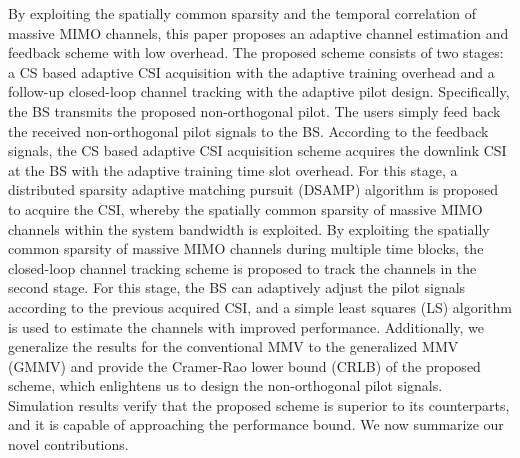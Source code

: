 \documentclass[final]{IEEEtran}
\begin{document}
 By exploiting the spatially common sparsity and the temporal correlation of massive MIMO
 channels, this paper proposes an adaptive channel estimation and feedback scheme with low
 overhead. The proposed scheme consists of two stages: a CS based adaptive CSI acquisition
 with the adaptive training overhead and a follow-up closed-loop channel tracking with the
 adaptive pilot design. Specifically, the BS transmits the proposed non-orthogonal pilot.
 The users simply feed back the received non-orthogonal pilot signals to the BS. According
 to the feedback signals, the CS based adaptive CSI acquisition scheme acquires the downlink
 CSI at the BS with the adaptive training time slot overhead. For this stage, a distributed
 sparsity adaptive matching pursuit (DSAMP) algorithm is proposed to acquire the CSI, whereby
 the spatially common sparsity of massive MIMO channels within the system bandwidth is
 exploited. By exploiting the spatially common sparsity of massive MIMO channels during
 multiple time blocks, the closed-loop channel tracking scheme is proposed to track the
 channels in the second stage. For this stage, the BS can adaptively adjust the pilot signals
 according to the previous acquired CSI, and a simple least squares (LS) algorithm is
 used to estimate the channels with improved performance. Additionally, we generalize
 the results for the conventional MMV to the generalized MMV (GMMV) and provide the Cramer-Rao
 lower bound (CRLB) of the proposed scheme, which enlightens us to design the non-orthogonal
 pilot signals. Simulation results verify that the proposed scheme is superior to its
 counterparts, and it is capable of approaching the performance bound. We now summarize our
 novel contributions.
\end{document}
